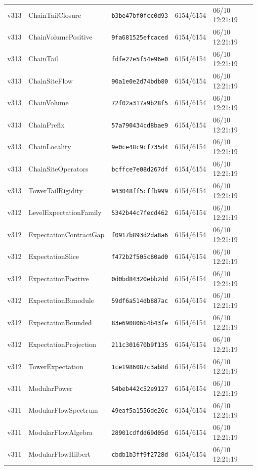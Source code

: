 \documentclass[11pt]{article}
\theoremstyle{definition}\newtheorem{deriv}{Derivation}
\begin{document}
{\begin{longtable}{@{}lllll@{}}
v313 & ChainTailClosure & \texttt{b3be47bf0fcc0d93} & 6154/6154 & 06/10 12:21:19 \\
v313 & ChainVolumePositive & \texttt{9fa681525efcaced} & 6154/6154 & 06/10 12:21:19 \\
v313 & ChainTail & \texttt{fdfe27e5f54e96e0} & 6154/6154 & 06/10 12:21:19 \\
v313 & ChainSiteFlow & \texttt{90a1e0e2d74bdb80} & 6154/6154 & 06/10 12:21:19 \\
v313 & ChainVolume & \texttt{72f02a317a9b28f5} & 6154/6154 & 06/10 12:21:19 \\
v313 & ChainPrefix & \texttt{57a790434cd8bae9} & 6154/6154 & 06/10 12:21:19 \\
v313 & ChainLocality & \texttt{9e0ce48c9cf735d4} & 6154/6154 & 06/10 12:21:19 \\
v313 & ChainSiteOperators & \texttt{bcffce7e08d267df} & 6154/6154 & 06/10 12:21:19 \\
v313 & TowerTailRigidity & \texttt{943048ff5cffb999} & 6154/6154 & 06/10 12:21:19 \\
v312 & LevelExpectationFamily & \texttt{5342b44c7fecd462} & 6154/6154 & 06/10 12:21:19 \\
v312 & ExpectationContractGap & \texttt{f0917b893d2da8a6} & 6154/6154 & 06/10 12:21:19 \\
v312 & ExpectationSlice & \texttt{f472b2f505c80ad0} & 6154/6154 & 06/10 12:21:19 \\
v312 & ExpectationPositive & \texttt{0d0bd84320ebb2dd} & 6154/6154 & 06/10 12:21:19 \\
v312 & ExpectationBimodule & \texttt{59df6a514db887ac} & 6154/6154 & 06/10 12:21:19 \\
v312 & ExpectationBounded & \texttt{83e690806b4b43fe} & 6154/6154 & 06/10 12:21:19 \\
v312 & ExpectationProjection & \texttt{211c301670b9f135} & 6154/6154 & 06/10 12:21:19 \\
v312 & TowerExpectation & \texttt{1ce1986087c3ab8d} & 6154/6154 & 06/10 12:21:19 \\
v311 & ModularPower & \texttt{54beb442c52e9127} & 6154/6154 & 06/10 12:21:19 \\
v311 & ModularFlowSpectrum & \texttt{49eaf5a1556de26c} & 6154/6154 & 06/10 12:21:19 \\
v311 & ModularFlowAlgebra & \texttt{28901cdfdd69d05d} & 6154/6154 & 06/10 12:21:19 \\
v311 & ModularFlowHilbert & \texttt{cbdb1b3ff9f2728d} & 6154/6154 & 06/10 12:21:19 \\

\end{longtable}}
\end{document}
